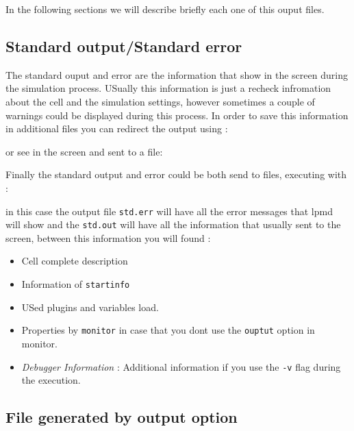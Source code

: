 In the following sections we will describe briefly each one of this ouput files.

\subsection{Standard output/Standard error}
The standard ouput and error are the information that {\lpmd} show in the
screen during the simulation process. USually this information is just a
recheck infromation about the cell and the simulation settings, however
sometimes a couple of warnings could be displayed during this process. In order
to save this information in additional files you can redirect the output using :


or see in the screen and sent to a file:


Finally the standard output and error could be both send to files, executing
{\lpmd} with :

\noindent
in this case the output file \verb|std.err| will have all the error messages
that lpmd will show and the \verb|std.out| will have all the information that
{\lpmd} usually sent to the screen, between this information you will found :

\begin{itemize}
 \item Cell complete description
 \item Information of \verb|startinfo|
 \item USed plugins and variables load.
 \item Properties by \verb|monitor| in case that you dont use the \verb|ouptut|
option in monitor.
 \item \textit{Debugger Information} : Additional information if you use the
\verb|-v| flag during the execution.
\end{itemize}

\subsection{File generated by output option}

